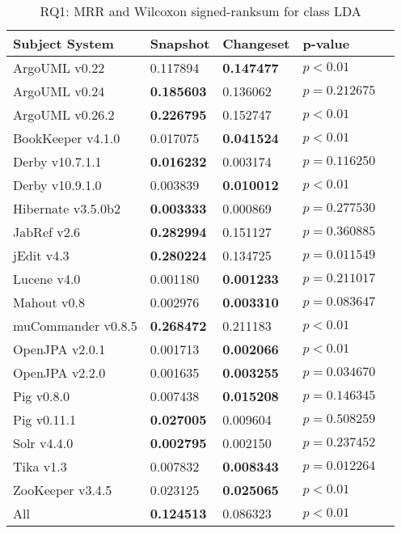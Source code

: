 
\begin{table}[t]
\renewcommand{\arraystretch}{1.3}
\footnotesize
\centering
\caption{RQ1: MRR and Wilcoxon signed-ranksum for class LDA}
\begin{tabular}{l|ll|ll}
   \toprule
    Subject System & Snapshot & Changeset & p-value  \\
    \midrule

ArgoUML v0.22 & 0.117894 & {\bf 0.147477 } & $p < 0.01$ \\
ArgoUML v0.24 & {\bf 0.185603 } & 0.136062 & $p = 0.212675$ \\
ArgoUML v0.26.2 & {\bf 0.226795 } & 0.152747 & $p < 0.01$ \\
BookKeeper v4.1.0 & 0.017075 & {\bf 0.041524 } & $p < 0.01$ \\
Derby v10.7.1.1 & {\bf 0.016232 } & 0.003174 & $p = 0.116250$ \\
Derby v10.9.1.0 & 0.003839 & {\bf 0.010012 } & $p < 0.01$ \\
Hibernate v3.5.0b2 & {\bf 0.003333 } & 0.000869 & $p = 0.277530$ \\
JabRef v2.6 & {\bf 0.282994 } & 0.151127 & $p = 0.360885$ \\
jEdit v4.3 & {\bf 0.280224 } & 0.134725 & $p = 0.011549$ \\
Lucene v4.0 & 0.001180 & {\bf 0.001233 } & $p = 0.211017$ \\
Mahout v0.8 & 0.002976 & {\bf 0.003310 } & $p = 0.083647$ \\
muCommander v0.8.5 & {\bf 0.268472 } & 0.211183 & $p < 0.01$ \\
OpenJPA v2.0.1 & 0.001713 & {\bf 0.002066 } & $p < 0.01$ \\
OpenJPA v2.2.0 & 0.001635 & {\bf 0.003255 } & $p = 0.034670$ \\
Pig v0.8.0 & 0.007438 & {\bf 0.015208 } & $p = 0.146345$ \\
Pig v0.11.1 & {\bf 0.027005 } & 0.009604 & $p = 0.508259$ \\
Solr v4.4.0 & {\bf 0.002795 } & 0.002150 & $p = 0.237452$ \\
Tika v1.3 & 0.007832 & {\bf 0.008343 } & $p = 0.012264$ \\
ZooKeeper v3.4.5 & 0.023125 & {\bf 0.025065 } & $p < 0.01$ \\
\midrule
All & {\bf 0.124513 } & 0.086323 & $p < 0.01$ \\

    \bottomrule
\end{tabular}
\label{table:rq1:class:lda}
\end{table}


